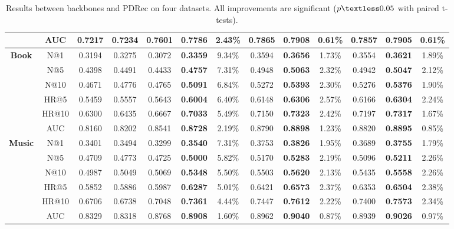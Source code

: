 \documentclass[letterpaper]{article} %
\begin{document}
\begin{table}[!t]
\begin{tabular}{|c|c|cc|ccc|ccc|ccc|}
    & AUC   & 0.7217 & 0.7234 & 0.7601 & \textbf{0.7786} & 2.43\% & 0.7865 & \textbf{0.7908} & 0.61\%  & 0.7857 & \textbf{0.7905} & 0.61\%  \\ \hline
\multirow{6}{*}{\textbf{Book}}
    & N@1   & 0.3194 & 0.3275 & 0.3072 & \textbf{0.3359} & 9.34\% & 0.3594 & \textbf{0.3656} & 1.73\%  & 0.3554 & \textbf{0.3621} & 1.89\%  \\
    & N@5   & 0.4398 & 0.4491 & 0.4433 & \textbf{0.4757} & 7.31\% & 0.4948 & \textbf{0.5063} & 2.32\%  & 0.4942 & \textbf{0.5047} & 2.12\%  \\
    & N@10  & 0.4671 & 0.4776 & 0.4765 & \textbf{0.5091} & 6.84\% & 0.5272 & \textbf{0.5393} & 2.30\%  & 0.5276 & \textbf{0.5376} & 1.90\%  \\
    & HR@5  & 0.5459 & 0.5557 & 0.5643 & \textbf{0.6004} & 6.40\% & 0.6148 & \textbf{0.6306} & 2.57\%  & 0.6166 & \textbf{0.6304} & 2.24\%  \\
    & HR@10 & 0.6300 & 0.6435 & 0.6667 & \textbf{0.7033} & 5.49\% & 0.7150 & \textbf{0.7323} & 2.42\%  & 0.7197 & \textbf{0.7317} & 1.67\%  \\
    & AUC   & 0.8160 & 0.8202 & 0.8541 & \textbf{0.8728} & 2.19\% & 0.8790 & \textbf{0.8898} & 1.23\%  & 0.8820 & \textbf{0.8895} & 0.85\%  \\ \hline
\multirow{6}{*}{\textbf{Music}}
    & N@1   & 0.3401 & 0.3494 & 0.3299 & \textbf{0.3540} & 7.31\% & 0.3753 & \textbf{0.3826} & 1.95\%  & 0.3689 & \textbf{0.3755} & 1.79\%  \\
    & N@5   & 0.4709 & 0.4773 & 0.4725 & \textbf{0.5000} & 5.82\% & 0.5170  & \textbf{0.5283} & 2.19\%  & 0.5096 & \textbf{0.5211} & 2.26\%  \\
    & N@10  & 0.4987 & 0.5049 & 0.5069 & \textbf{0.5348} & 5.50\% & 0.5503 & \textbf{0.5620} & 2.13\% & 0.5435 & \textbf{0.5558} & 2.26\%  \\
    & HR@5  & 0.5852 & 0.5886 & 0.5987 & \textbf{0.6287} & 5.01\% & 0.6421 & \textbf{0.6573} & 2.37\%  & 0.6353 & \textbf{0.6504} & 2.38\%  \\
    & HR@10 & 0.6706 & 0.6738 & 0.7048 & \textbf{0.7361} & 4.44\% & 0.7447 & \textbf{0.7612} & 2.22\%  & 0.7400 & \textbf{0.7573} & 2.34\%  \\
    & AUC   & 0.8329 & 0.8318 & 0.8768 & \textbf{0.8908} & 1.60\% & 0.8962 & \textbf{0.9040}  & 0.87\% & 0.8939 & \textbf{0.9026} & 0.97\%  \\ \hline
\end{tabular}
\caption{Results between backbones and PDRec on four datasets. All improvements are significant ($p \textless 0.05$ with paired t-tests).}
\label{tab:main_results}
\end{table}
\end{document}
